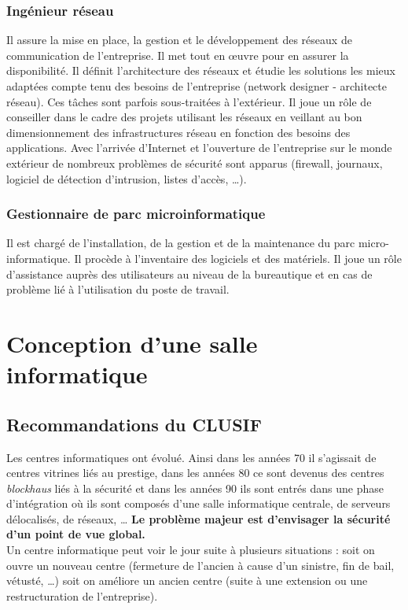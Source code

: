 \documentclass[10pt,a4paper,oneside,titlepage]{report}
\newcommand{\titre}[1]{\textcolor{title}{#1}}
\newcommand{\newterm}[1]{\textit{#1}}
\newcommand{\strong}[1]{\textbf{\titre{#1}}}
\begin{document}
\subsubsection{Ingénieur réseau}
Il assure la mise en place, la gestion et le développement des réseaux de
communication de l’entreprise. Il met tout en œuvre pour en assurer la
disponibilité. Il définit l’architecture des réseaux et étudie les solutions les
mieux adaptées compte tenu des besoins de l’entreprise (network designer -
architecte réseau). Ces tâches sont parfois sous-traitées à l’extérieur.
Il joue un rôle de conseiller dans le cadre des projets utilisant les réseaux en
veillant au bon dimensionnement des infrastructures réseau en fonction des
besoins des applications. Avec l’arrivée d’Internet et l’ouverture de
l’entreprise sur le monde extérieur de nombreux problèmes de sécurité sont
apparus (firewall, journaux, logiciel de détection d’intrusion, listes d’accès,
\dots).

\subsubsection{Gestionnaire de parc microinformatique}
Il est chargé de l’installation, de la gestion et de la maintenance du parc
micro-informatique. Il procède à l’inventaire des logiciels et des matériels.
Il joue un rôle d’assistance auprès des utilisateurs au niveau de la bureautique
et en cas de problème lié à l’utilisation du poste de travail.

\section{Conception d'une salle informatique}

\subsection{Recommandations du CLUSIF}

Les centres informatiques ont évolué. Ainsi dans les années 70 il s'agissait de
centres vitrines liés au prestige, dans les années 80 ce sont devenus des
centres \newterm{blockhaus} liés à la sécurité et dans les années 90 ils sont
entrés dans une phase d'intégration où ils sont composés d'une salle
informatique centrale, de serveurs délocalisés, de réseaux, \dots
\strong{Le problème majeur est d'envisager la sécurité d'un point de vue
global.} \\

Un centre informatique peut voir le jour suite à plusieurs situations : soit on
ouvre un nouveau centre (fermeture de l'ancien à cause d'un sinistre, fin de
bail, vétusté, \dots) soit on améliore un ancien centre (suite à une extension
ou une restructuration de l'entreprise). \\
\end{document}
